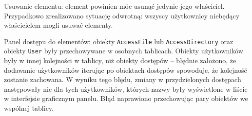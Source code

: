 \documentclass[a4paper,twoside,12pt]{book}
\begin{document}
Usuwanie elementu: element powinien móc usunąć jedynie jego właściciel. Przypadkowo zrealizowano sytuację odwrotną: wszyscy użytkownicy niebędący właścicielem mogli usuwać elementy.

Panel dostępu do elementów: obiekty \texttt{AccessFile} lub \texttt{AccessDirectory} oraz obiekty \texttt{User} były przechowywane w osobnych tablicach. Obiekty użytkowników były w innej kolejności w tablicy, niż obiekty dostępów -- błędnie założono, że dodawanie użytkowników iterując po obiektach dostępów spowoduje, że kolejność zostanie zachowana. W wyniku tego błędu, zmiany w przydzielonych dostępach następowały nie dla tych użytkowników, których nazwy były wyświetlone w liście w interfejsie graficznym panelu. Błąd naprawiono przechowując pary obiektów we wspólnej tablicy.
\end{document}
